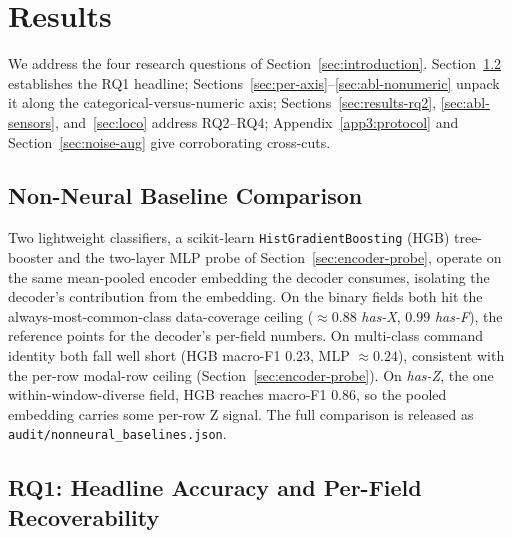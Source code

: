 \documentclass[sensors,article,submit,moreauthors,pdftex]{Definitions/mdpi}
\begin{document}
\section{Results}
\label{sec:experiments}

We address the four research questions of Section~\ref{sec:introduction}. Section~\ref{sec:results-headline} establishes the RQ1 headline; Sections~\ref{sec:per-axis}--\ref{sec:abl-nonumeric} unpack it along the categorical-versus-numeric axis; Sections~\ref{sec:results-rq2}, \ref{sec:abl-sensors}, and~\ref{sec:loco} address RQ2--RQ4; Appendix~\ref{app3:protocol} and Section~\ref{sec:noise-aug} give corroborating cross-cuts.

\subsection{Non-Neural Baseline Comparison}
\label{sec:results-baseline}

Two lightweight classifiers, a scikit-learn \texttt{HistGradientBoosting} (HGB) tree-booster and the two-layer MLP probe of Section~\ref{sec:encoder-probe}, operate on the same mean-pooled encoder embedding the decoder consumes, isolating the decoder's contribution from the embedding. On the binary fields both hit the always-most-common-class data-coverage ceiling ($\approx\!0.88$ \emph{has-X}, $0.99$ \emph{has-F}), the reference points for the decoder's per-field numbers. On multi-class command identity both fall well short (HGB macro-F1 $0.23$, MLP $\approx\!0.24$), consistent with the per-row modal-row ceiling (Section~\ref{sec:encoder-probe}). On \emph{has-Z}, the one within-window-diverse field, HGB reaches macro-F1 $0.86$, so the pooled embedding carries some per-row Z signal. The full comparison is released as \texttt{audit/nonneural\_baselines.json}.


\subsection{RQ1: Headline Accuracy and Per-Field Recoverability}
\label{sec:results-headline}
\end{document}
